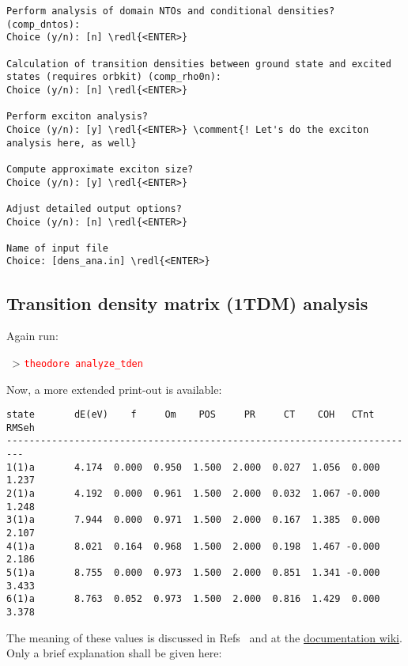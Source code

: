 \documentclass[DIV=12,headings=normal]{scrartcl}
\newcommand{\comment}[1]{\textcolor{blue}{#1}}
\newcommand{\redl}[1]{{\textcolor{red}{\texttt{#1}}}}
\newcommand{\comm}[1]{
\small
~> \redl{#1}
\normalsize
}
\begin{document}
\begin{Verbatim}[commandchars=\\\{\}]
Perform analysis of domain NTOs and conditional densities? (comp_dntos):
Choice (y/n): [n] \redl{<ENTER>}

Calculation of transition densities between ground state and excited states (requires orbkit) (comp_rho0n):
Choice (y/n): [n] \redl{<ENTER>}

Perform exciton analysis?
Choice (y/n): [y] \redl{<ENTER>} \comment{! Let's do the exciton analysis here, as well}

Compute approximate exciton size?
Choice (y/n): [y] \redl{<ENTER>}

Adjust detailed output options?
Choice (y/n): [n] \redl{<ENTER>}

Name of input file
Choice: [dens_ana.in] \redl{<ENTER>}
\end{Verbatim}
\normalsize
%
\subsection{Transition density matrix (1TDM) analysis}

Again run:

\comm{theodore analyze\_tden}

\clearpage
Now, a more extended print-out is available:

\scriptsize
\begin{Verbatim}[commandchars=\\\{\}]
state       dE(eV)    f     Om    POS     PR     CT    COH   CTnt  RMSeh
-------------------------------------------------------------------------
1(1)a       4.174  0.000  0.950  1.500  2.000  0.027  1.056  0.000  1.237
2(1)a       4.192  0.000  0.961  1.500  2.000  0.032  1.067 -0.000  1.248
3(1)a       7.944  0.000  0.971  1.500  2.000  0.167  1.385  0.000  2.107
4(1)a       8.021  0.164  0.968  1.500  2.000  0.198  1.467 -0.000  2.186
5(1)a       8.755  0.000  0.973  1.500  2.000  0.851  1.341 -0.000  3.433
6(1)a       8.763  0.052  0.973  1.500  2.000  0.816  1.429  0.000  3.378
\end{Verbatim}
\normalsize

The meaning of these values is discussed in Refs~\cite{DMAT, DMAT_ADC_II} and at the \href{https://sourceforge.net/p/theodore-qc/wiki/Transition density matrix analysis/}{documentation wiki}. Only a brief explanation shall be given here:
\end{document}
